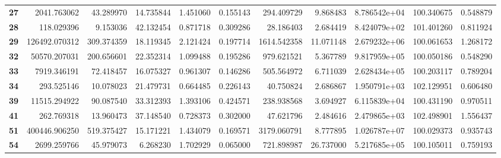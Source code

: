\begin{table}[h]
\begin{tabular}{lrrrrrrrrrr}
\textbf{27} &    2041.763062 &       43.289970 &                  14.735844 &  1.451060 &  0.155143 &   294.409729 &   9.868483 &  8.786542e+04 &  100.340675 &     0.548879 \\
\textbf{28} &     118.029396 &        9.153036 &                  42.132454 &  0.871718 &  0.309286 &    28.186403 &   2.684419 &  8.424079e+02 &  101.401260 &     0.811924 \\
\textbf{29} &  126492.070312 &      309.374359 &                  18.119345 &  2.121424 &  0.197714 &  1614.542358 &  11.071148 &  2.679232e+06 &  100.061653 &     1.268172 \\
\textbf{32} &   50570.207031 &      200.656601 &                  22.352314 &  1.099488 &  0.195286 &   979.621521 &   5.367789 &  9.817959e+05 &  100.050186 &     0.548290 \\
\textbf{33} &    7919.346191 &       72.418457 &                  16.075327 &  0.961307 &  0.146286 &   505.564972 &   6.711039 &  2.628434e+05 &  100.203117 &     0.789204 \\
\textbf{34} &     293.525146 &       10.078023 &                  21.479731 &  0.664485 &  0.226143 &    40.750824 &   2.686867 &  1.950791e+03 &  102.129951 &     0.606480 \\
\textbf{39} &   11515.294922 &       90.087540 &                  33.312393 &  1.393106 &  0.424571 &   238.938568 &   3.694927 &  6.115839e+04 &  100.431190 &     0.970511 \\
\textbf{41} &     262.769318 &       13.960473 &                  37.148540 &  0.728373 &  0.302000 &    47.621796 &   2.484616 &  2.479865e+03 &  102.498901 &     1.556437 \\
\textbf{51} &  400446.906250 &      519.375427 &                  15.171221 &  1.434079 &  0.169571 &  3179.060791 &   8.777895 &  1.026787e+07 &  100.029373 &     0.935743 \\
\textbf{54} &    2699.259766 &       45.979073 &                   6.268230 &  1.702929 &  0.065000 &   721.898987 &  26.737000 &  5.217685e+05 &  100.105011 &     0.759193 \\
\bottomrule
\end{tabular}
\end{table}
